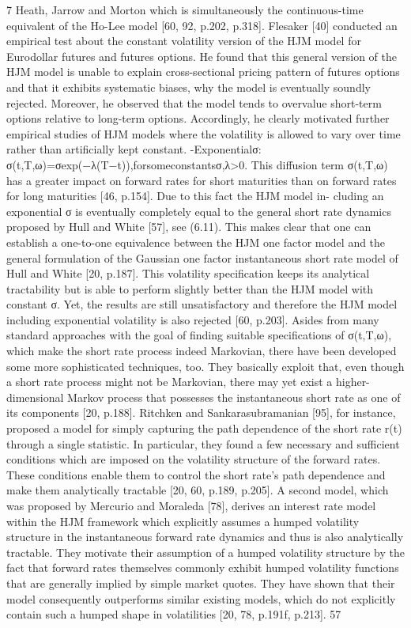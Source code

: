 7 Heath, Jarrow and Morton
which is simultaneously the continuous-time equivalent of the Ho-Lee model [60, 92, p.202, p.318].
Flesaker [40] conducted an empirical test about the constant volatility version of the HJM model for Eurodollar futures and futures options. He found that this general version of the HJM model is unable to explain cross-sectional pricing pattern of futures options and that it exhibits systematic biases, why the model is eventually soundly rejected. Moreover, he observed that the model tends to overvalue short-term options relative to long-term options. Accordingly, he clearly motivated further empirical studies of HJM models where the volatility is allowed to vary over time rather than artificially kept constant.
-Exponentialσ: σ(t,T,ω)=σexp(−λ(T−t)),forsomeconstantsσ,λ>0.
This diffusion term σ(t,T,ω) has a greater impact on forward rates for short maturities than on forward rates for long maturities [46, p.154]. Due to this fact the HJM model in- cluding an exponential σ is eventually completely equal to the general short rate dynamics proposed by Hull and White [57], see (6.11). This makes clear that one can establish a one-to-one equivalence between the HJM one factor model and the general formulation of the Gaussian one factor instantaneous short rate model of Hull and White [20, p.187].
This volatility specification keeps its analytical tractability but is able to perform slightly better than the HJM model with constant σ. Yet, the results are still unsatisfactory and therefore the HJM model including exponential volatility is also rejected [60, p.203].
Asides from many standard approaches with the goal of finding suitable specifications of σ(t,T,ω), which make the short rate process indeed Markovian, there have been developed some more sophisticated techniques, too. They basically exploit that, even though a short rate process might not be Markovian, there may yet exist a higher-dimensional Markov process that possesses the instantaneous short rate as one of its components [20, p.188]. Ritchken and Sankarasubramanian [95], for instance, proposed a model for simply capturing the path dependence of the short rate r(t) through a single statistic. In particular, they found a few necessary and sufficient conditions which are imposed on the volatility structure of the forward rates. These conditions enable them to control the short rate’s path dependence and make them analytically tractable [20, 60, p.189, p.205].
A second model, which was proposed by Mercurio and Moraleda [78], derives an interest rate model within the HJM framework which explicitly assumes a humped volatility structure in the instantaneous forward rate dynamics and thus is also analytically tractable. They motivate their assumption of a humped volatility structure by the fact that forward rates themselves commonly exhibit humped volatility functions that are generally implied by simple market quotes. They have shown that their model consequently outperforms similar existing models, which do not explicitly contain such a humped shape in volatilities [20, 78, p.191f, p.213].
57
